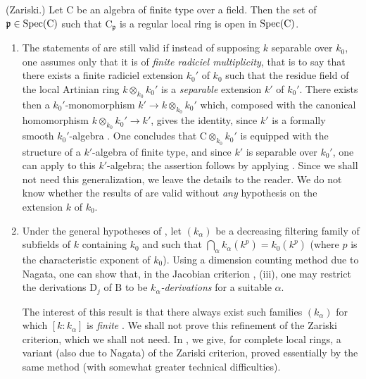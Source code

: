 \begin{corollary}[22.6.8]
\label{0.22.6.8}
\textnormal{(Zariski.)}
Let $\mathrm{C}$ be an algebra of finite type over a field.
Then the set of $\mathfrak{p}\in\operatorname{Spec}(\mathrm{C})$ such that $\mathrm{C}_\mathfrak{p}$ is a regular local ring is \textup{open} in $\operatorname{Spec}(\mathrm{C})$.
\end{corollary}

\begin{remarks}[22.6.9]
\label{0.22.6.9}
\begin{enumerate}
  \item[\rm{(i)}] The statements of  are still valid if instead of supposing $k$ separable over $k_0$, one assumes only that it is of \emph{finite radiciel multiplicity}, that is to say  that there exists a finite radiciel extension $k_0'$ of $k_0$ such that the residue field of the local Artinian ring $k\otimes_{k_0}k_0'$ is a \emph{separable} extension $k'$ of $k_0'$.
  There exists then a $k_0'$-monomorphism
  $k'\to k\otimes_{k_0}k_0'$ which, composed with the canonical homomorphism
  $k\otimes_{k_0}k_0'\to k'$, gives the identity, since $k'$ is a formally
  smooth $k_0'$-algebra . One concludes that
  $\mathrm{C}\otimes_{k_0}k_0'$ is equipped with the structure of a
  $k'$-algebra of finite type, and since $k'$ is separable over $k_0'$, one
  can apply  to this $k'$-algebra; the assertion follows by
  applying . Since we shall not need this generalization, we
  leave the details to the reader.
  We do not know whether the results of  are valid without \emph{any} hypothesis on the extension $k$ of $k_0$.
  \item[\rm{(ii)}] Under the general hypotheses of , let $(k_\alpha)$ be a decreasing filtering family of subfields of $k$ containing $k_0$ and such that $\bigcap_\alpha k_\alpha(k^p)=k_0(k^p)$ (where $p$ is the characteristic exponent of $k_0$).
  Using a dimension counting method due to Nagata, one can show that, in the
  Jacobian criterion , (iii), one may restrict the derivations
  $\mathrm{D}_j$ of $\mathrm{B}$ to be \emph{$k_\alpha$-derivations} for a suitable
  $\alpha$.


  The interest of this result is that there always exist such families
  $(k_\alpha)$ for which $[k:k_\alpha]$ is \emph{finite} . We shall
  not prove this refinement of the Zariski criterion, which we shall not need.
  In , we give, for complete local rings, a variant (also due to
  Nagata) of the Zariski criterion, proved essentially by the same method
  (with somewhat greater technical difficulties).
\end{enumerate}
\end{remarks}

